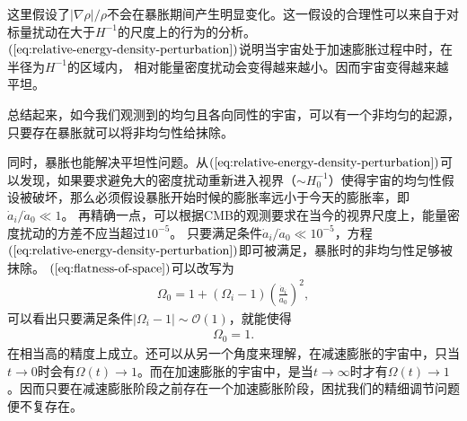 这里假设了$|\nabla\rho|/\rho$不会在暴胀期间产生明显变化。这一假设的合理性可以来自于对标量扰动在大于$H^{-1}$的尺度上的行为的分析。
$(\ref{eq:relative-energy-density-perturbation})$说明当宇宙处于加速膨胀过程中时，在半径为$H^{-1}$的区域内，
相对能量密度扰动会变得越来越小。因而宇宙变得越来越平坦。

总结起来，如今我们观测到的均匀且各向同性的宇宙，可以有一个非均匀的起源，只要存在暴胀就可以将非均匀性给抹除。

同时，暴胀也能解决平坦性问题。从$(\ref{eq:relative-energy-density-perturbation})$可以发现，如果要求避免大的密度扰动重新进入视界（$\sim
H_0^{-1}$）使得宇宙的均匀性假设被破坏，那么必须假设暴胀开始时候的膨胀率远小于今天的膨胀率，即$\dot{a}_{i}/\dot{a}_0\ll
1$。
再精确一点，可以根据CMB的观测要求在当今的视界尺度上，能量密度扰动的方差不应当超过$10^{-5}$。
只要满足条件$\dot{a}_{i}/\dot{a}_0\ll
10^{-5}$，方程$(\ref{eq:relative-energy-density-perturbation})$即可被满足，暴胀时的非均匀性足够被抹除。
$(\ref{eq:flatness-of-space})$可以改写为
\begin{align}
  \Omega_0=1+{\left(\Omega_{i}-1\right)}{\left(\frac{\dot{a}_{i}}{\dot{a}_0}\right)}^2,
\end{align}
可以看出只要满足条件$|\Omega_{i}-1|\sim\mathcal{O}(1)$，就能使得
\begin{align}
  \Omega_0=1.
\end{align}
在相当高的精度上成立。还可以从另一个角度来理解，在减速膨胀的宇宙中，只当$t\rightarrow
0$时会有$\Omega(t)\rightarrow
1$。而在加速膨胀的宇宙中，是当$t\rightarrow\infty$时才有$\Omega(t)\rightarrow
1$。因而只要在减速膨胀阶段之前存在一个加速膨胀阶段，困扰我们的精细调节问题便不复存在。



